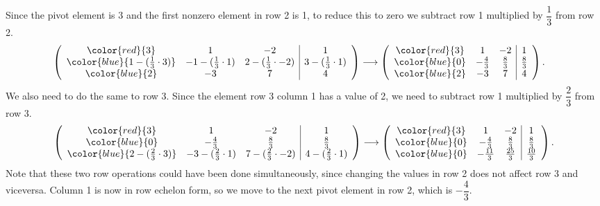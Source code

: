 \documentclass[letterpaper,10pt,english]{jupyterBook}
\begin{document}
\sphinxAtStartPar
Since the pivot element is 3 and the first non\sphinxhyphen{}zero element in row 2 is 1, to reduce this to zero we subtract row 1 multiplied by \(\dfrac{1}{3}\) from row 2.
\begin{equation*}
\begin{split} \begin{align*}
  \left( \begin{array}{ccc|c}
      \color{red}{ 3} & 1 & -2 & 1 \\
      \color{blue}{ 1 - (\frac{1}{3}\cdot 3)} & -1 - (\frac{1}{3}\cdot 1) & 2 - (\frac{1}{3}\cdot -2) & 3 - (\frac{1}{3}\cdot 1) \\
      \color{blue}{ 2} & -3 & 7 & 4
  \end{array} \right) &
  \longrightarrow
  \left( \begin{array}{ccc|c}
      \color{red}{ 3} & 1 & -2 & 1 \\
      \color{blue}{ 0} & -\frac{4}{3} & \frac{8}{3} & \frac{8}{3} \\
      \color{blue}{ 2} & -3 & 7 & 4
  \end{array} \right).
\end{align*} \end{split}
\end{equation*}
\sphinxAtStartPar
We also need to do the same to row 3. Since the element row 3 column 1 has a value of 2, we need to subtract row 1 multiplied by \(\dfrac{2}{3}\) from row 3.
\begin{equation*}
\begin{split} \left( \begin{array}{ccc|c}
    \color{red}{3} & 1 & -2 & 1 \\
    \color{blue}{0} & -\frac{4}{3} & \frac{8}{3} & \frac{8}{3} \\
    \color{blue}{2 - (\frac{2}{3}\cdot 3)} & -3 - (\frac{2}{3}\cdot 1) & 7 - (\frac{2}{3}\cdot -2) & 4 - (\frac{2}{3}\cdot 1)
\end{array} \right)
\longrightarrow  
\left( \begin{array}{ccc|c}
    \color{red}{3} & 1 & -2 & 1 \\
    \color{blue}{0} & -\frac{4}{3} & \frac{8}{3} & \frac{8}{3} \\
    \color{blue}{0} & -\frac{11}{3} & \frac{25}{3} & \frac{10}{3}
\end{array} \right). \end{split}
\end{equation*}
\sphinxAtStartPar
Note that these two row operations could have been done simultaneously, since changing the values in row 2 does not affect row 3 and vice\sphinxhyphen{}versa. Column 1 is now in row echelon form, so we move to the next pivot element in row 2, which is \(-\dfrac{4}{3}\).
\end{document}
